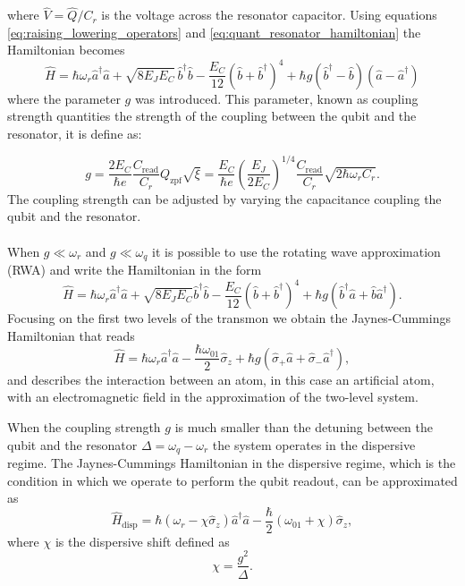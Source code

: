 where $\hat{V} = \hat{Q}/C_r$ is the voltage across the resonator capacitor. Using equations \ref{eq:raising_lowering_operators} and \ref{eq:quant_resonator_hamiltonian} the Hamiltonian becomes
\begin{equation}
    \hat{H} = \hbar \omega_r \hat{a}^\dagger \hat{a}  + \sqrt{8 E_J E_C} \, \hat{b}^\dagger \hat{b} - \frac{E_C}{12} (\hat{b} + \hat{b}^\dagger)^4 + \hbar g (\hat{b}^\dagger - \hat{b})(\hat{a} - \hat{a}^\dagger)
\end{equation}
where the parameter $g$ was introduced. This parameter, known as coupling strength quantities the strength of the coupling between the qubit and the resonator, it is define as:

\begin{equation}
    g = \frac{2 E_C}{\hbar e} \frac{C_{\text{read}}}{C_r} Q_{\text{zpf}} \sqrt{\xi} = \frac{E_C}{\hbar e} \left( \frac{E_J}{2 E_C} \right)^{1/4} \frac{C_{\text{read}}}{C_r} \sqrt{2 \hbar \omega_r C_r}.
\end{equation} 
The coupling strength can be adjusted by varying the capacitance coupling the qubit and the resonator.

\paragraph{}
When $g\ll\omega_r$ and $g\ll\omega_q$ it is possible to use the rotating wave approximation (RWA) and write the Hamiltonian in the form
\begin{equation}
    \hat{H} = \hbar \omega_r \hat{a}^\dagger \hat{a} + \sqrt{8E_J E_C} \hat{b}^\dagger \hat{b} - \frac{E_C}{12} (\hat{b} + \hat{b}^\dagger)^4 + \hbar g (\hat{b}^\dagger \hat{a} + \hat{b} \hat{a}^\dagger).
\end{equation}
Focusing on the first two levels of the transmon we obtain the Jaynes-Cummings Hamiltonian \cite{1443594} that reads
\begin{equation}\label{eq:Jaynes-Cummings}
    \hat{H} = \hbar \omega_r \hat{a}^\dagger \hat{a} - \frac{\hbar \omega_{01}}{2} \hat{\sigma}_z + \hbar g (\hat{\sigma}_+ \hat{a} + \hat{\sigma}_- \hat{a}^\dagger),
\end{equation}
and describes the interaction between an atom, in this case an artificial atom, with an electromagnetic field in the approximation of the two-level system.

When the coupling strength $g$ is much smaller than the detuning between the qubit and the resonator $\Delta = \omega_q -\omega_r $ the system operates in the dispersive regime.
The Jaynes-Cummings Hamiltonian in the dispersive regime, which is the condition in which we operate to perform the qubit readout, can be approximated as 
\begin{equation}\label{eq:dispersiveshift_hamiltonian}
    \hat{H}_{\text{disp}} = \hbar (\omega_r - \chi \hat{\sigma}_z) \hat{a}^\dagger \hat{a} - \frac{\hbar}{2} (\omega_{01} + \chi) \hat{\sigma}_z,
\end{equation}
where $\chi$ is the dispersive shift defined as \begin{equation}\label{eq:dispersiveshift}
    \chi = \frac{g^2}{\Delta}.
\end{equation}

